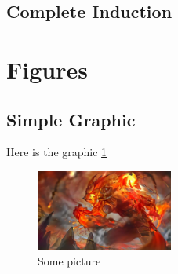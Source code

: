 \documentclass{scrartcl}
\begin{document}
\subsection{Complete Induction}

\section{Figures}
\subsection{Simple Graphic}
Here is the graphic \ref{fig:AutumnCatch}
\noindent
\FloatBarrier
\begin{figure}[ht]
    \centering
    \includegraphics[width=0.4\textwidth]{Graphics/Herbstfang.jpg}
    \caption{Some picture}
    \label{fig:AutumnCatch}
\end{figure}
\FloatBarrier
\noindent
\end{document}
